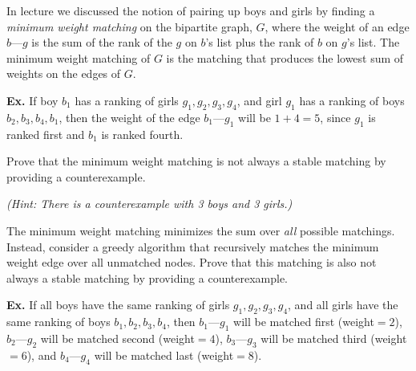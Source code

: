 \documentclass[12pt,twoside]{article}
\begin{document}



\begin{problem}{20}

In lecture we discussed the notion of pairing up boys and girls by finding a \textit{minimum weight matching} on the bipartite graph, $G$, where the weight of an edge $b$---$g$ is the sum of the rank of the $g$ on $b$'s list plus the rank of $b$ on $g$'s list. The minimum weight matching of $G$ is the matching that produces the lowest sum of weights on the edges of $G$.

\textbf{Ex.} If boy $b_1$ has a ranking of girls $g_1,g_2,g_3,g_4$, and girl $g_1$ has a ranking of boys $b_2,b_3,b_4,b_1$, then the weight of the edge $b_1$---$g_1$ will be $1+4 = 5$, since $g_1$ is ranked first and $b_1$ is ranked fourth.

\begin{problemparts}

Prove that the minimum weight matching is not always a stable matching by providing a counterexample.

\textit{(Hint: There is a counterexample with 3 boys and 3 girls.)}


The minimum weight matching minimizes the sum over \textit{all} possible matchings. Instead, consider a greedy algorithm that recursively matches the minimum weight edge over all unmatched nodes. Prove that this matching is also not always a stable matching by providing a counterexample.

\textbf{Ex.} If all boys have the same ranking of girls $g_1,g_2,g_3,g_4$, and all girls have the same ranking of boys $b_1,b_2,b_3,b_4$, then $b_1$---$g_1$ will be matched first (weight$=2$), $b_2$---$g_2$ will be matched second (weight$=4$), $b_3$---$g_3$ will be matched third (weight$=6$), and $b_4$---$g_4$ will be matched last (weight$=8$).


\end{problemparts}
\end{problem}
\end{document}
